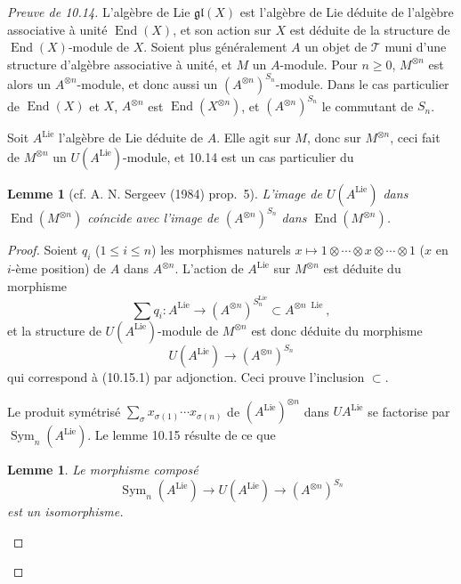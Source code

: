 \documentclass[11pt,a4paper]{article}
\theoremstyle{plain}
\newtheorem{lemma}[theorem]{Lemme}
\theoremstyle{definition}
\DeclareMathOperator{\End}{End}
\DeclareMathOperator{\Sym}{Sym}
\DeclareMathOperator{\Lie}{Lie}
\begin{document}
\begin{proof}[Preuve de 10.14]
L'alg\`ebre de Lie $\mathfrak{gl}(X)$ est l'alg\`ebre de Lie d\'eduite de l'alg\`ebre associative \`a unit\'e $\End(X)$, et son action sur $X$ est d\'eduite de la structure de $\End(X)$-module de $X$. Soient plus g\'en\'eralement $A$ un objet de $\mathcal{T}$ muni d'une structure d'alg\`ebre associative \`a unit\'e, et $M$ un $A$-module. Pour $n \geq 0$, $M^{\otimes n}$ est alors un $A^{\otimes n}$-module, et donc aussi un $(A^{\otimes n})^{S_n}$-module. Dans le cas particulier de $\End(X)$ et $X$, $A^{\otimes n}$ est $\End(X^{\otimes n})$, et $(A^{\otimes n})^{S_n}$ le commutant de $S_n$.

Soit $A^{\Lie}$ l'alg\`ebre de Lie d\'eduite de $A$. Elle agit sur $M$, donc sur $M^{\otimes n}$, ceci fait de $M^{\otimes n}$ un $U(A^{\Lie})$-module, et 10.14 est un cas particulier du

\begin{lemma}[cf. A. N. Sergeev (1984) prop.~5]
L'image de $U(A^{\Lie})$ dans $\End(M^{\otimes n})$ co\'incide avec l'image de $(A^{\otimes n})^{S_n}$ dans $\End(M^{\otimes n})$.
\end{lemma}

\begin{proof}
Soient $q_i$ ($1 \leq i \leq n$) les morphismes naturels $x \mapsto 1 \otimes \cdots \otimes x \otimes \cdots \otimes 1$ ($x$ en $i$-\`eme position) de $A$ dans $A^{\otimes n}$. L'action de $A^{\Lie}$ sur $M^{\otimes n}$ est d\'eduite du morphisme
\begin{equation}
\sum q_i : A^{\Lie} \to (A^{\otimes n})^{S_n^{\Lie}} \subset A^{\otimes n\;\Lie}, \tag{10.15.1}
\end{equation}
et la structure de $U(A^{\Lie})$-module de $M^{\otimes n}$ est donc d\'eduite du morphisme
\begin{equation}
U(A^{\Lie}) \to (A^{\otimes n})^{S_n} \tag{10.15.2}
\end{equation}
qui correspond \`a (10.15.1) par adjonction. Ceci prouve l'inclusion $\subset$.

Le produit sym\'etris\'e $\sum_\sigma x_{\sigma(1)} \cdots x_{\sigma(n)}$ de $(A^{\Lie})^{\otimes n}$ dans $U A^{\Lie}$ se factorise par $\Sym_n(A^{\Lie})$. Le lemme 10.15 r\'esulte de ce que

\begin{lemma}
Le morphisme compos\'e
\begin{equation}
\Sym_n(A^{\Lie}) \to U(A^{\Lie}) \to (A^{\otimes n})^{S_n} \tag{10.16.1}
\end{equation}
est un isomorphisme.
\end{lemma}


\end{proof}
\end{proof}
\end{document}

